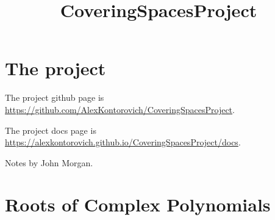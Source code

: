 \usepackage{amsmath, amsthm}
\usepackage{hyperref}

\theoremstyle{definition}
\newtheorem{definition}{Definition}
\newtheorem{theorem}{Theorem}
\newtheorem{proposition}{Proposition}
\newtheorem{lemma}{Lemma}
\newtheorem{corollary}{Corollary}

\title{CoveringSpacesProject}

\newcommand{\eps}{\epsilon}

\newcommand{\R}{\mathbb{R}}
\newcommand{\Q}{\mathbb{Q}}
\newcommand{\C}{\mathbb{C}}
\newcommand{\Z}{\mathbb{Z}}
\newcommand{\N}{\mathbb{N}}



\maketitle

\chapter{The project}

The project github page is \url{https://github.com/AlexKontorovich/CoveringSpacesProject}.

The project docs page is \url{https://alexkontorovich.github.io/CoveringSpacesProject/docs}.

Notes by John Morgan.

\chapter{Roots of Complex Polynomials}


%

%

%

%
%


